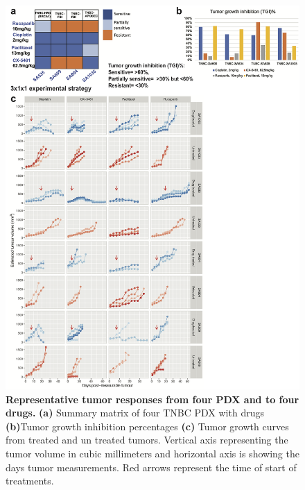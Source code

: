 



\begin{figure}
\centering
	\includegraphics[width=\textwidth]{Figures/chap3/4drugs4PDXNew.png}
	\caption[Representative tumor responses from four PDX and  to four drugs]
	{\small
	   \textbf{Representative tumor responses from four PDX and  to four drugs.}
	    \textbf{(a)} Summary matrix of four TNBC PDX with drugs
	     \textbf{(b)}Tumor growth inhibition percentages
	    \textbf{(c)} Tumor growth curves from treated and un treated tumors. Vertical axis representing the tumor volume in cubic millimeters and horizontal axis is showing the days tumor measurements. Red arrows represent the time of start of treatments.
}
	\label{fig:EstablishmentofPDX}
\end{figure}





